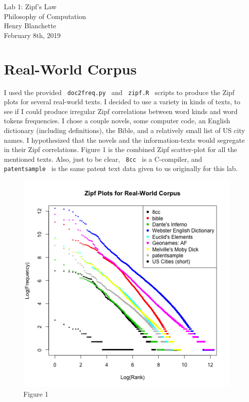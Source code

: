 \documentclass{article}
\begin{document}
\begin{center}{\huge   Lab 1: Zipf's Law }\\[0.4cm]{\large  Philosophy of Computation }\\[0.75cm]{\large  Henry Blanchette }\\[0.5cm]{\large  February 8th, 2019 }\\[1.0cm]\end{center}\section{Real-World Corpus}

I used the provided \texttt{ doc2freq.py } and \texttt{ zipf.R } scripts to produce the Zipf plots for several real-world texts. I decided to use a variety in kinds of texts, to see if I could produce irregular Zipf correlations between word kinds and word tokens frequencies. I chose a couple novels, some computer code, an English dictionary (including definitions), the Bible, and a relatively small list of US city names. I hypothesized that the novels and the information-texts would segregate in their Zipf correlations. Figure 1 is the combined Zipf scatter-plot for all the mentioned texts. Also, just to be clear, \texttt{ 8cc } is a C-compiler, and \texttt{ patentsample } is the same patent text data given to us originally for this lab.


\begin{figure}[h]
\centering
\includegraphics[width=13cm,keepaspectratio]{zipf-combined.png}
\captionsetup{labelformat=empty} \caption{Figure 1}
\end{figure}
\end{document}
